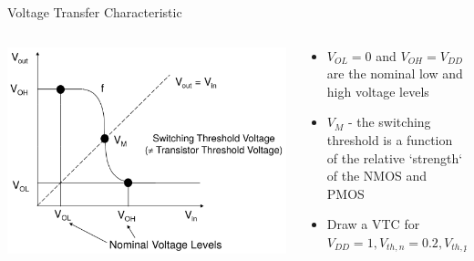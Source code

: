 \documentclass[12pt,aspectratio=169]{beamer}
\begin{document}
\begin{frame}{Voltage Transfer Characteristic}
  \begin{columns}
    \begin{column}{0.5\textwidth}
      \begin{center}
        \includegraphics[width=\textwidth]{vtc.png}
      \end{center}
    \end{column}
    \begin{column}{0.5\textwidth}
      \begin{itemize}
        \setlength\itemsep{0.75em}
        \item $V_{OL} = 0$ and $V_{OH} = V_{DD}$ are the nominal low and high voltage levels
        \item $V_M$ - the switching threshold is a function of the relative `strength` of the NMOS and PMOS
        \item Draw a VTC for $V_{DD} = 1, V_{th,n} = 0.2, V_{th,p} = 0.3, R_{on,n}=10 k\Omega, R_{on,p}=20 k\Omega$
      \end{itemize}
    \end{column}
  \end{columns}
\end{frame}
\end{document}
